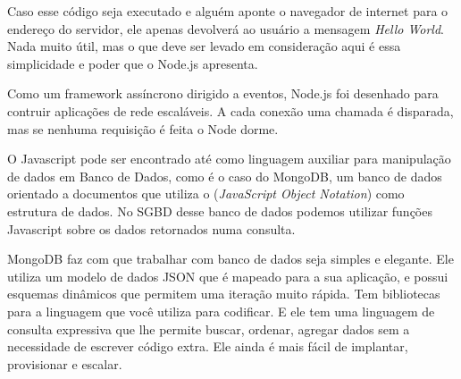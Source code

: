 Caso esse código seja executado e alguém aponte o navegador de internet para o endereço do servidor, ele apenas devolverá ao usuário a mensagem \textit{Hello World}. Nada muito útil, mas o que deve ser levado em consideração aqui é essa simplicidade e poder que o Node.js apresenta.
\begin{citacao}
Como um framework assíncrono dirigido a eventos, Node.js foi desenhado para contruir aplicações de rede escaláveis. A cada conexão uma chamada é disparada, mas se nenhuma requisição é feita o Node dorme. \cite{nodejs}
\end{citacao}

O Javascript pode ser encontrado até como linguagem auxiliar para manipulação de dados em Banco de Dados, como é o caso do MongoDB, um banco de dados orientado a documentos que utiliza o  (\textit{JavaScript Object Notation}) como estrutura de dados.
No SGBD desse banco de dados podemos utilizar funções Javascript sobre os dados retornados numa consulta.
\begin{citacao}
MongoDB faz com que trabalhar com banco de dados seja simples e elegante. Ele utiliza um modelo de dados JSON que é mapeado para a sua aplicação, e possui esquemas dinâmicos que permitem uma iteração muito rápida. Tem bibliotecas para a linguagem que você utiliza para codificar. E ele tem uma linguagem de consulta expressiva que lhe permite buscar, ordenar, agregar dados sem a necessidade de escrever código extra. Ele ainda é mais fácil de implantar, provisionar e escalar.\cite{mongodb}
\end{citacao}